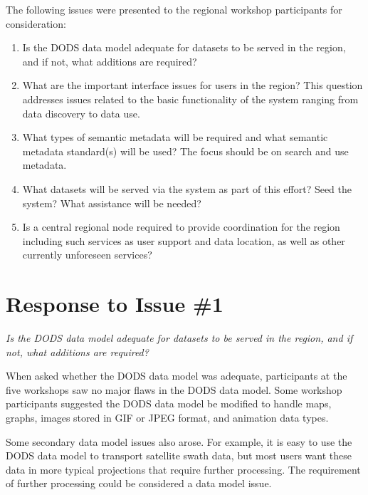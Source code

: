 \documentclass{report}
\newcommand{\pause}{\vspace{10pt}}
\begin{document}
The following issues were presented to the regional workshop
participants for consideration:

\begin{enumerate}
\item Is the DODS data model adequate for datasets to be served in the
  region, and if not, what additions are required?  
\item What are the important interface issues for users in the region?
  This question addresses issues related to the basic functionality of
  the system ranging from data discovery to data use.  
\item What types of semantic metadata will be required and what
  semantic metadata standard(s) will be used?  The focus should be on
  search and use metadata. 
\item What datasets will be served via the system as part of this
  effort?  Seed the system?  What assistance will be needed?  
\item Is a central regional node required to provide coordination for
  the region including such services as user support and data
  location, as well as other currently unforeseen services?
\end{enumerate}

\section{Response to Issue \#1}

\emph{Is the DODS data model adequate for datasets to be served in the
region, and if not, what additions are required?}\pause

When asked whether the DODS data model was adequate, participants at
the five workshops saw no major flaws in the DODS data model.  Some
workshop participants suggested the DODS data model be modified to
handle maps, graphs, images stored in GIF or JPEG format, and
animation data types.

Some secondary data model issues also arose.  For example, it is easy
to use the DODS data model to transport satellite swath data, but most
users want these data in more typical projections that require further
processing.  The requirement of further processing could be considered
a data model issue.  

\end{document}
